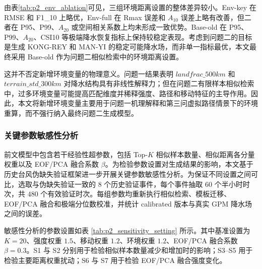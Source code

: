\documentclass[UTF8,a4paper,zihao=5,fontset=fandol]{ctexart}
\numberwithin{equation}{section}
\numberwithin{figure}{section}
\numberwithin{table}{section}
\begin{document}
\begin{table}[H]
\centering
\caption{环境变量消融验证结果}
\label{tab:p2_env_ablation}
\end{table}

由表\ref{tab:p2_env_ablation}可见，三组环境距离设置的整体差异较小。Env-key 在 RMSE 和 F1\_10 上略优，Env-full 在 Rmax 误差和 $A_{10}$ 误差上略有改善，但二者在 P95、P99、$A_{20}$ 或空间相关系数上均未形成一致优势。Base-old 在 P95、P99、$A_{20}$、CSI10 等极端降水恢复指标上保持较稳定表现。考虑到问题二的目标是生成 KONG-REY 和 MAN-YI 的稳定可能降水场，而非单一指标最优，本文最终采用 Base-old 作为问题二相似检索中的环境距离设置。

这并不否定新增环境变量的物理意义。问题一结果表明 $landfrac\_500km$ 和 $terrain\_std\_300km$ 对降水结构具有非线性解释力；但在问题二有限样本相似检索中，过多环境变量可能提高匹配维度并稀释强度、路径和移动特征的主导作用。因此，本文将新增环境变量主要用于问题一机理解释和第三问虚拟路径情景下的环境重算，而不强行纳入最终问题二生成模型。

\subsubsection{关键参数敏感性分析}

前文模型中包含若干经验性超参数，包括 Top-$K$ 相似样本数量、相似距离各分量权重以及 EOF/PCA 融合系数 $\beta$。为检验参数设置对生成结果的影响，本文基于历史台风伪缺失验证框架进一步开展关键参数敏感性分析。为保证不同设置之间可比，选取与伪缺失验证一致的 $8$ 个历史验证事件，每个事件抽取 $60$ 个半小时时次，共 $480$ 个有效验证时次。每组参数均重新执行相似检索、模板迁移、EOF/PCA 融合和极端分位数校准，并统计 calibrated 版本与真实 GPM 降水场之间的误差。

敏感性分析的参数设置如表 \ref{tab:p2_sensitivity_setting} 所示。其中基准设置为 $K=20$、强度权重 $1.5$、移动权重 $1.2$、环境权重 $1.2$、EOF/PCA 融合系数 $\beta=0.3$。S1 与 S2 分别用于检验相似样本数量减少和增加时的影响；S3--S5 用于检验主要距离权重扰动；S6 与 S7 用于检验 EOF/PCA 融合强度变化。
\end{document}
